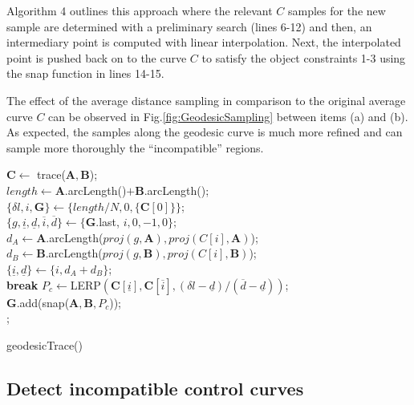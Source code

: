 \documentclass[journal, letterpaper]{IEEEtran}
\begin{document}
Algorithm 4 outlines this approach where the relevant $C$ samples for the new sample are
determined with a preliminary search (lines 6-12) and then, an intermediary point is computed
with linear interpolation. Next, the interpolated point is pushed back on to the curve $C$
to satisfy the object constraints 1-3 using the snap function in lines 14-15.

The effect of the average distance sampling in comparison to the original average curve
$C$ can be observed in Fig.\ref{fig:GeodesicSampling} between items (a) and (b). As expected, the samples
along the geodesic curve is much more refined and can sample more thoroughly the ``incompatible''
regions.

\begin{algorithm}[ht!]
  $\mathbf{C} \leftarrow$ trace($\mathbf{A}, \mathbf{B}$); \\
  $length \leftarrow \mathbf{A}.$arcLength()$ + \mathbf{B}.$arcLength(); \\
  $\{\delta l, i, \mathbf{G}\} \leftarrow \{length / N, 0, \{\mathbf{C}[0]\}\}$;\\
   {
    $\{g, \underline{i}, \underline{d}, \overline{i}, \overline{d}\} \leftarrow \{\mathbf{G}$.last, $i,0,-1,0\};$ \\
     {
      $d_A \leftarrow \mathbf{A}.$arcLength($proj(g,\mathbf{A}), proj(C[i], \mathbf{A})$); \\
      $d_B \leftarrow \mathbf{B}.$arcLength($proj(g,\mathbf{B}), proj(C[i], \mathbf{B})$); \\
       $\{\underline{i}, \underline{d}\} \leftarrow \{i, d_A + d_B\}$; \\
    }
     {
			\textbf{break}
		}
    $P_c \leftarrow $LERP$(\mathbf{C}[\underline{i}], \mathbf{C}[\overline{i}], (\delta l - \underline{d}) / (\overline{d} - \underline{d}))$;\\
    $\mathbf{G}$.add(snap($\mathbf{A}, \mathbf{B}, P_c$)); \\
  }
  ;
  \caption{geodesicTrace()}
\end{algorithm}

\newpage
\subsection{Detect incompatible control curves}
\end{document}
